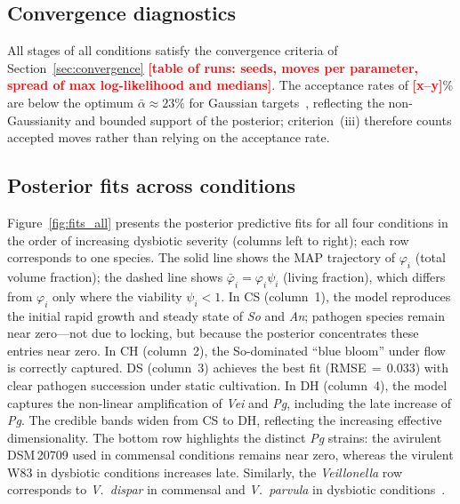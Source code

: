 \documentclass[pdflatex,sn-mathphys-num,lineno]{sn-jnl}
\newcommand{\TBD}[1]{\textcolor{red}{\textbf{[#1]}}}
\begin{document}
\subsection{Convergence diagnostics}

All stages of all conditions satisfy the convergence criteria of Section~\ref{sec:convergence} \TBD{table of runs: seeds, moves per parameter, spread of max log-likelihood and medians}.
The acceptance rates of \TBD{x--y}\% are below the optimum $\bar\alpha\approx23\%$ for Gaussian targets~\cite{RobertsRosenthal2001Optimal}, reflecting the non-Gaussianity and bounded support of the posterior; criterion~(iii) therefore counts accepted moves rather than relying on the acceptance rate.

\subsection{Posterior fits across conditions}

Figure~\ref{fig:fits_all} presents the posterior predictive fits for all four conditions in the order of increasing dysbiotic severity (columns left to right); each row corresponds to one species.
The solid line shows the MAP trajectory of $\varphi_i$ (total volume fraction); the dashed line shows $\bar{\varphi}_i=\varphi_i\psi_i$ (living fraction), which differs from $\varphi_i$ only where the viability $\psi_i<1$.
In CS (column~1), the model reproduces the initial rapid growth and steady state of \textit{So} and \textit{An}; pathogen species remain near zero---not due to locking, but because the posterior concentrates these entries near zero.
In CH (column~2), the So-dominated ``blue bloom'' under flow is correctly captured.
DS (column~3) achieves the best fit (RMSE\,$=$\,0.033) with clear pathogen succession under static cultivation.
In DH (column~4), the model captures the non-linear amplification of \textit{Vei} and \textit{Pg}, including the late increase of \textit{Pg}.
The credible bands widen from CS to DH, reflecting the increasing effective dimensionality.
The bottom row highlights the distinct \textit{Pg} strains: the avirulent DSM\,20709 used in commensal conditions remains near zero, whereas the virulent W83 in dysbiotic conditions increases late.
Similarly, the \textit{Veillonella} row corresponds to \textit{V.~dispar} in commensal and \textit{V.~parvula} in dysbiotic conditions~\cite{heine2025influence}.
\end{document}
